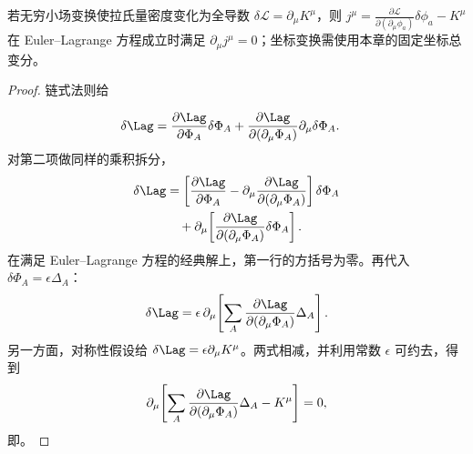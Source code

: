 \begin{theorem}
若无穷小场变换使拉氏量密度变化为全导数 $\delta\mathcal L=\partial_\mu K^\mu$，则 $j^\mu=\frac{\partial\mathcal L}{\partial(\partial_\mu\phi_a)}\delta\phi_a-K^\mu$ 在 Euler--Lagrange 方程成立时满足 $\partial_\mu j^\mu=0$；坐标变换需使用本章的固定坐标总变分。
\end{theorem}

\begin{proof}
链式法则给

\begin{align*}
 \delta\Lag
 &=\frac{\partial\Lag}{\partial\Phi_A}\delta\Phi_A
 +\frac{\partial\Lag}{\partial(\partial_\mu\Phi_A)}
 \partial_\mu\delta\Phi_A.
\end{align*}
对第二项做同样的乘积拆分，
\begin{align*}
 \delta\Lag
 &=\left[
 \frac{\partial\Lag}{\partial\Phi_A}
 -\partial_\mu\frac{\partial\Lag}{\partial(\partial_\mu\Phi_A)}
 \right]\delta\Phi_A\\
 &\quad+\partial_\mu\!\left[
 \frac{\partial\Lag}{\partial(\partial_\mu\Phi_A)}
 \delta\Phi_A\right].
\end{align*}
在满足 Euler--Lagrange 方程的经典解上，第一行的方括号为零。再代入 $\delta\Phi_A=\epsilon\Delta_A$：
\begin{equation*}
 \delta\Lag
 =\epsilon\,\partial_\mu\!\left[
 \sum_A\frac{\partial\Lag}{\partial(\partial_\mu\Phi_A)}
 \Delta_A\right].
\end{equation*}
另一方面，对称性假设给 $\delta\Lag=\epsilon\partial_\mu K^\mu$。两式相减，并利用常数 $\epsilon$ 可约去，得到
\begin{equation*}
 \partial_\mu\!\left[
 \sum_A\frac{\partial\Lag}{\partial(\partial_\mu\Phi_A)}
 \Delta_A-K^\mu\right]=0,
\end{equation*}
即。
\end{proof}
